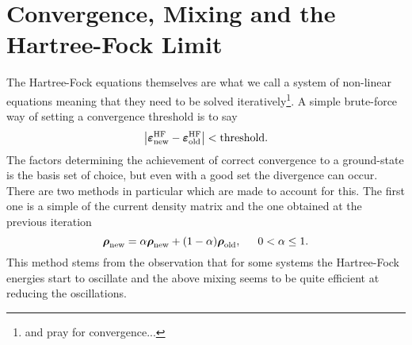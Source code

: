 \section{Convergence, Mixing and the Hartree-Fock Limit}
    The Hartree-Fock equations themselves are what we call a system of
    non-linear equations meaning that they need to be solved
    iteratively\footnote{and pray for convergence...}. A simple brute-force way
    of setting a convergence threshold is to say
        \begin{equation}
            \abs{\boldsymbol{{\varepsilon}}^{\text{HF}}_{\text{new}} -
            \boldsymbol{{\varepsilon}}^{\text{HF}}_{\text{old}}} < \text{threshold}.
            \label{eq:HFconvthresh}
        \end{equation}
    The factors determining the achievement of correct convergence to a
    ground-state is the basis set of choice, but even with a good set the
    divergence can occur.  There are two methods in particular which are made
    to account for this. The first one is a simple
     \cite{compphysThijssen} of the current density matrix and the
    one obtained at the previous iteration
        \begin{equation}
            \blds{\rho}_{\text{new}} = \alpha\blds{\rho}_{\text{new}} + (1 -
            \alpha)\blds{\rho}_{\text{old}},\indent 0<\alpha\leq 1.
            \label{eq:mixing}
        \end{equation}
    This method stems from the observation that for some systems the
    Hartree-Fock energies start to oscillate and the above mixing seems to be
    quite efficient at reducing the oscillations.

